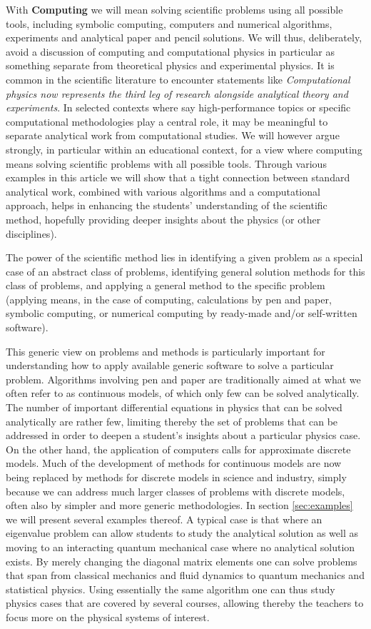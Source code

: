 \documentclass[graybox,envcountchap,sectrefs]{svmult}
\begin{document}
With \textbf{Computing } we will mean solving scientific problems using all
possible tools, including symbolic computing, computers and numerical
algorithms, experiments and analytical paper and pencil solutions. We
will thus, deliberately, avoid a discussion of computing  and
computational physics in particular as something separate from
theoretical physics and experimental physics.  It is common in the
scientific literature to encounter statements like \emph{Computational
physics now represents the third leg of research alongside analytical
theory and experiments}. In selected contexts where say
high-performance topics or specific computational methodologies play a
central role, it may be meaningful to separate analytical work from
computational studies. We will however argue strongly, in particular within an educational context,
for a view where
computing  means solving scientific problems with all possible
tools. Through various examples in this article we will show that a
tight connection between standard analytical work, combined with
various algorithms and a computational approach, helps in enhancing the
students' understanding of the scientific method, hopefully providing
deeper insights about the physics (or other disciplines).

The power of the scientific method lies in identifying a given problem
as a special case of an abstract class of problems, identifying
general solution methods for this class of problems, and applying a
general method to the specific problem (applying means, in the case of
computing, calculations by pen and paper, symbolic computing, or
numerical computing  by ready-made and/or self-written software).

This generic view on problems and methods is particularly important for
understanding how to apply available generic software to solve a
particular problem.  Algorithms involving pen and paper are
traditionally aimed at what we often refer to as continuous models, of
which only few can be solved analytically. The number of important
differential equations in physics that can be solved analytically are
rather few, limiting thereby the set of problems that can be addressed
in order to deepen a student's insights about a particular physics
case. On the other hand, the application of computers calls for
approximate discrete models.  Much of the development of methods for
continuous models are now being replaced by methods for discrete
models in science and industry, simply because we can address much
larger classes of problems with discrete models, often also by simpler
and more generic methodologies.  In section \ref{sec:examples} we will present
several examples thereof. A typical case is that where an eigenvalue
problem can allow students to study the analytical solution as well as
moving to an interacting quantum mechanical case where no analytical
solution exists. By merely changing the diagonal matrix elements one
can solve problems that span from classical mechanics and fluid
dynamics to quantum mechanics and statistical physics.  Using
essentially the same algorithm one can thus study physics cases that
are covered by several courses, allowing thereby the teachers to focus
more on the physical systems of interest.
\end{document}
